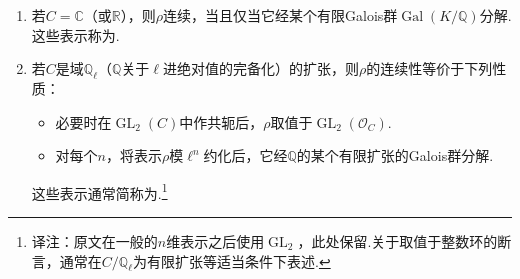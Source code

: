 \begin{enumerate}[label=\roman*)]

\item 若$C=\mathbb C$（或$\mathbb R$），则$\rho$连续，当且仅当它经某个有限Galois群$\operatorname{Gal}(K/\mathbb Q)$分解.这些表示称为.

\item 若$C$是域$\mathbb Q_\ell$（$\mathbb Q$关于$\ell$进绝对值的完备化）的扩张，则$\rho$的连续性等价于下列性质：

\begin{itemize}

\item 必要时在$\operatorname{GL}_2(C)$中作共轭后，$\rho$取值于$\operatorname{GL}_2(\mathcal O_C)$.

\item 对每个$n$，将表示$\rho$模$\ell^n$约化后，它经$\mathbb Q$的某个有限扩张的Galois群分解.

\end{itemize}

这些表示通常简称为.\footnote{译注：原文在一般的$n$维表示之后使用$\operatorname{GL}_2$，此处保留.关于取值于整数环的断言，通常在$C/\mathbb Q_\ell$为有限扩张等适当条件下表述.}

\end{enumerate}



